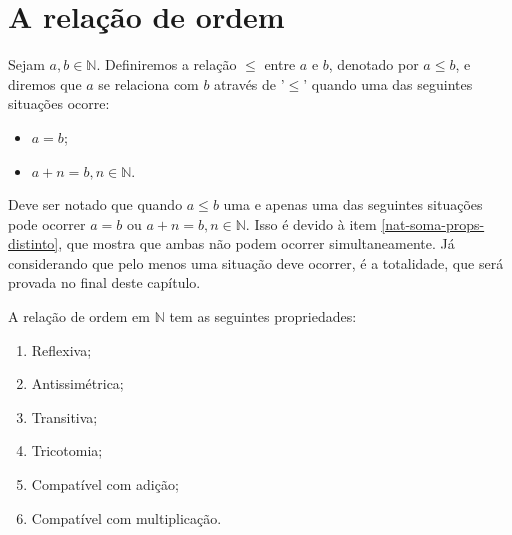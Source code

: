 \documentclass[../main.tex]{subfiles}
\begin{document}
\section{A relação de ordem}
\begin{defi}\label{def-relOrdem-N}
Sejam $a, b \in \mathbb{N}$. Definiremos a relação $\leq$ entre $a$ e $b$, denotado por $a \leq b$, e diremos que $a$ se relaciona com $b$ através de '$\leq$' quando uma das seguintes situações ocorre:
    \begin{itemize}
        \item $a = b$;
        \item $a + n = b, n \in \mathbb{N}$.
    \end{itemize} 
\end{defi}
\begin{obs}
    Deve ser notado que quando $a \leq b$ uma e apenas uma das seguintes situações pode ocorrer $a = b$ ou $a + n = b, n \in \mathbb{N}$. Isso é devido à  item \ref{nat-soma-props-distinto}, que mostra que ambas não podem ocorrer simultaneamente. Já considerando que pelo menos uma situação deve ocorrer, é a totalidade, que será provada no final deste capítulo. 
\end{obs}
\begin{prop}{A relação de ordem em $\mathbb{N}$ tem as seguintes propriedades:}
    \begin{enumerate}[label=(\roman*)]
        \item Reflexiva;
        \item Antissimétrica;
        \item Transitiva;
        \item Tricotomia;
        \item Compatível com adição;
        \item Compatível com multiplicação.
    \end{enumerate}
\end{prop}
\end{document}
